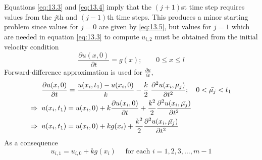 \documentclass[../main-sheet.tex]{subfiles}
\begin{document}
    Equations \eqref{eq:13.3} and \eqref{eq:13.4} imply that the \((j+1)\)st time step requires values from the \(j\)th and \((j-1)\)th time steps. This produces a minor starting problem since values for \(j=0\) are given by \eqref{eq:13.5}, but values for \(j=1\) which are needed in equation \eqref{eq:13.3} to compute \(u_{i,2}\) must be obtained from the initial velocity condition
    \[\frac{\partial u(x,0)}{\partial t}=g(x);\qquad 0\leq x\leq l\]
    Forward-difference approximation is used for \(\frac{\partial u}{ \partial t}\),
    \begin{align}
        & \frac{\partial u(x,0)}{\partial t}=\frac{u(x_i,t_1)-u(x_i,0)}{k}-\frac{k}{2}\;\frac{\partial^2 u(x_i,\bar{\mu_j})}{\partial t^2};\quad 0< \bar{\mu_j}< t_1\label{eq:13.7}\\
        \Rightarrow\;\;& u(x_i,t_1)=u(x_i,0)+k\frac{\partial u(x_i,0)}{\partial t}+\frac{k^2}{2}\frac{\partial^2 u(x_i,\bar{\mu_j})}{\partial t^2}\notag\\
        \Rightarrow\;\;& u(x_i,t_1)=u(x_i,0)+kg(x_i)+\frac{k^2}{2}\frac{\partial^2 u(x_i,\bar{\mu_j})}{\partial t^2}\label{eq:13.8}
    \end{align}
    As a consequence
    \begin{equation}
        u_{i,1}=u_{i,0}+kg(x_i) \quad \text{ for each } i=1,2,3,\dots,m-1 \label{eq:13.9}
    \end{equation}
\end{document}

